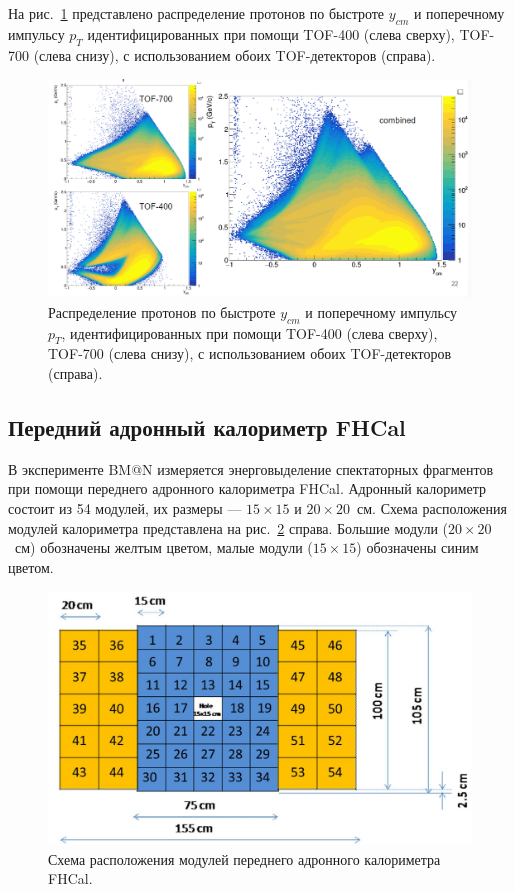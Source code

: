 На рис.~\ref{fig:bmn_pt_y} представлено распределение протонов по быстроте $y_{cm}$ и поперечному импульсу $p_T$ идентифицированных при помощи TOF-400 (слева сверху), TOF-700 (слева снизу), с использованием обоих TOF-детекторов (справа).
%
\begin{figure}[ht]
\begin{center}
\includegraphics[width=0.95\linewidth]{images/bmn_pt_y_acceptance.png}
\caption{Распределение протонов по быстроте $y_{cm}$ и поперечному импульсу $p_T$, идентифицированных при помощи TOF-400 (слева сверху), TOF-700 (слева снизу), с использованием обоих TOF-детекторов (справа).}
\label{fig:bmn_pt_y}
\end{center}
\end{figure}

\subsection{Передний адронный калориметр FHCal}

В эксперименте BM@N измеряется энерговыделение спектаторных фрагментов при помощи переднего адронного калориметра FHCal.
Адронный калориметр состоит из 54 модулей, их размеры --- $15\times15$ и $20\times20$~см.
Схема расположения модулей калориметра представлена на рис.~\ref{fig:fhcal_layout} справа.
Большие модули ($20\times20$~см) обозначены желтым цветом, малые модули ($15\times15$) обозначены синим цветом. 
%
\begin{figure}[ht]
\begin{center}
\includegraphics[width=0.95\linewidth]{images/FHCal_modules.png}
\caption{Схема расположения модулей переднего адронного калориметра FHCal.}
\label{fig:fhcal_layout}
\end{center}
\end{figure}

